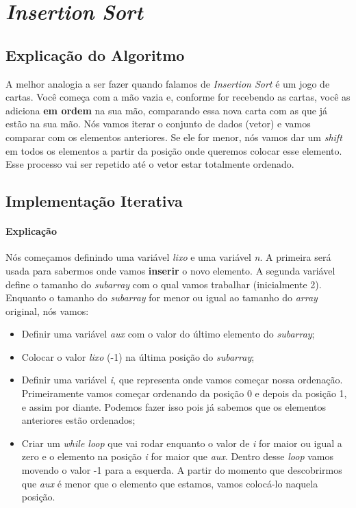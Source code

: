 \section{\textit{Insertion Sort}}

\subsection{Explicação do Algoritmo}
A melhor analogia a ser fazer quando falamos de \textit{Insertion Sort} é um jogo de cartas. Você começa com a mão vazia e, conforme for recebendo as cartas, você as adiciona
\textbf{em ordem} na sua mão, comparando essa nova carta com as que já estão na sua mão. Nós vamos iterar o conjunto de dados (vetor) e vamos comparar com os elementos anteriores.
Se ele for menor, nós vamos dar um \textit{shift} em todos os elementos a partir da posição onde queremos colocar esse elemento. Esse processo vai ser repetido até o vetor estar
totalmente ordenado.

\subsection{Implementação Iterativa}
\paragraph{Explicação}
Nós começamos definindo uma variável \textit{lixo} e uma variável \textit{n}. A primeira será usada para sabermos onde vamos \textbf{inserir} o novo elemento. A segunda
variável define o tamanho do \textit{subarray} com o qual vamos trabalhar (inicialmente 2). Enquanto o tamanho do \textit{subarray} for menor ou igual ao tamanho do \textit{array} original, nós vamos:
\begin{itemize}
  \item Definir uma variável \textit{aux} com o valor do último elemento do \textit{subarray};
  \item Colocar o valor \textit{lixo} (-1) na última posição do \textit{subarray};
  \item Definir uma variável \textit{i}, que representa onde vamos começar nossa ordenação. Primeiramente vamos começar ordenando da posição 0 e depois da posição 1, e assim por diante.
    Podemos fazer isso pois já sabemos que os elementos anteriores estão ordenados;
  \item Criar um \textit{while loop} que vai rodar enquanto o valor de \textit{i} for maior ou igual a zero e o elemento na posição \textit{i} for maior que \textit{aux}. Dentro desse \textit{loop}
    vamos movendo o valor -1 para a esquerda. A partir do momento que descobrirmos que \textit{aux} é menor que o elemento que estamos, vamos colocá-lo naquela posição.
\end{itemize}

